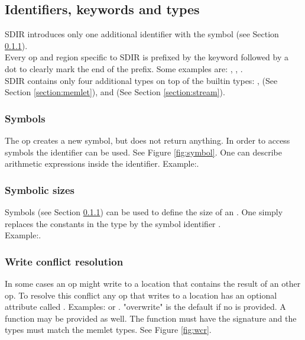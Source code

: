 \subsection{Identifiers, keywords and types}
SDIR introduces only one additional identifier with the symbol \codeword{\$} (see Section \ref{section:symbol}).\\
Every op and region specific to SDIR is prefixed by the keyword  followed by a dot to clearly mark the end of the prefix. Some examples are: , , . \\
SDIR contains only four additional types on top of the builtin types: ,  (See Section \ref{section:memlet}),  and  (See Section \ref{section:stream}).

\subsubsection{Symbols} \label{section:symbol}
The op  creates a new symbol, but does not return anything. In order to access symbols the identifier \codeword{\$()} can be used. See Figure \ref{fig:symbol}. One can describe arithmetic expressions inside the identifier. Example:.

 \subsubsection{Symbolic sizes}
 Symbols (see Section \ref{section:symbol}) can be used to define the size of an . One simply replaces the constants in the type by the symbol identifier \codeword{\$()}.\\
 Example:.
 
 \subsubsection{Write conflict resolution}
In some cases an op might write to a location that contains the result of an other op. To resolve this conflict any op that writes to a location has an optional attribute called . Examples: or . "overwrite" is the default if no  is provided. A function may be provided as well. The function must have the signature  and the types must match the memlet types. See Figure \ref{fig:wcr}.


